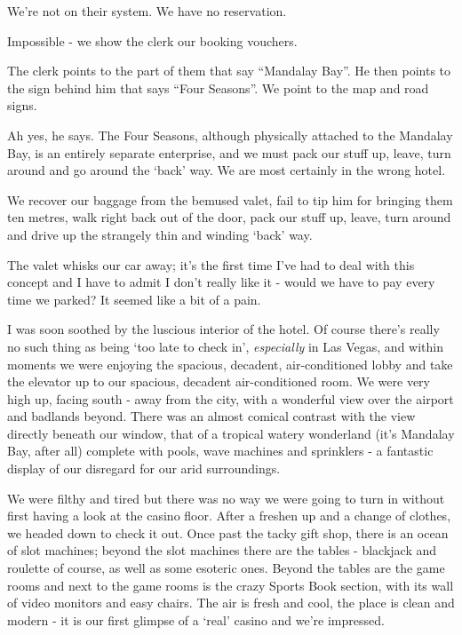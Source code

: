 \documentclass[a5paper,titlepage,11pt]{book}
\begin{document}
We're not on their system.  We have no reservation.

Impossible - we show the clerk our booking vouchers.

The clerk points to the part of them that say ``Mandalay Bay''.  He then points to the sign behind him that says ``Four Seasons''.  We point to the map and road signs.

Ah yes, he says.  The Four Seasons, although physically attached to the Mandalay Bay, is an entirely separate enterprise, and we must pack our stuff up, leave, turn around and go around the `back' way.  We are most certainly in the wrong hotel.

We recover our baggage from the bemused valet, fail to tip him for bringing them ten metres, walk right back out of the door, pack our stuff up, leave, turn around and drive up the strangely thin and winding `back' way.

The valet whisks our car away; it's the first time I've had to deal with this concept and I have to admit I don't really like it - would we have to pay every time we parked?  It seemed like a bit of a pain.

I was soon soothed by the luscious interior of the hotel.  Of course there's really no such thing as being `too late to check in', \emph{especially} in Las Vegas, and within moments we were enjoying the spacious, decadent, air-conditioned lobby and take the elevator up to our spacious, decadent air-conditioned room.  We were very high up, facing south - away from the city, with a wonderful view over the airport and badlands beyond.  There was an almost comical contrast with the view directly beneath our window, that of a tropical watery wonderland (it's Mandalay Bay, after all) complete with pools, wave machines and sprinklers - a fantastic display of our disregard for our arid surroundings.

We were filthy and tired but there was no way we were going to turn in without first having a look at the casino floor.  After a freshen up and a change of clothes, we headed down to check it out.  Once past the tacky gift shop, there is an ocean of slot machines; beyond the slot machines there are the tables - blackjack and roulette of course, as well as some esoteric ones.  Beyond the tables are the game rooms and next to the game rooms is the crazy Sports Book section, with its wall of video monitors and easy chairs.  The air is fresh and cool, the place is clean and modern - it is our first glimpse of a `real' casino and we're impressed.
\end{document}

